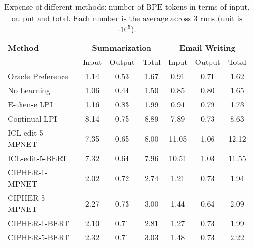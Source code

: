 
\begin{table}[t!]
\centering \small

\setlength{\tabcolsep}{14pt}
\caption{Expense of different methods: number of BPE tokens in terms of input, output and total. Each number is the average across 3 runs (unit is $\cdot 10^5$). }
\begin{tabular}{l c c c c c c }
\toprule
    \textbf{Method} & \multicolumn{3}{c}{\textbf{Summarization}} & \multicolumn{3}{c}{\textbf{Email Writing}} \\
    & Input & Output & Total & Input & Output & Total \\
\midrule
    Oracle Preference & 1.14 & 0.53 & 1.67 & 0.91 & 0.71 & 1.62 \\
\midrule
    No Learning &  1.06 & 0.44 & 1.50 & 0.85 & 0.80 & 1.65 \\
    E-then-e LPI & 1.16 & 0.83 & 1.99 & 0.94 & 0.79 & 1.73 \\
    Continual LPI & 8.14 & 0.75 & 8.89 & 7.89 & 0.73 & 8.63 \\
\midrule
    ICL-edit-5-MPNET & 7.35 & 0.65 & 8.00 & 11.05 & 1.06 & 12.12 \\
    ICL-edit-5-BERT & 7.32 & 0.64 & 7.96 & 10.51 & 1.03 & 11.55 \\
\midrule
    CIPHER-1-MPNET & 2.02 & 0.72 & 2.74 & 1.21 & 0.73 & 1.94 \\
    CIPHER-5-MPNET & 2.27 & 0.73 & 3.00 & 1.44 & 0.64 & 2.09 \\
    CIPHER-1-BERT & 2.10 & 0.71 & 2.81 & 1.27 & 0.73 & 1.99 \\
    CIPHER-5-BERT & 2.32 & 0.71 & 3.03 & 1.48 & 0.73 & 2.22 \\
\bottomrule
\end{tabular}
    \label{tab:expense_breakdown}
\end{table}

